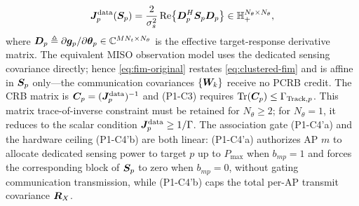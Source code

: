 \begin{equation}\label{eq:fim-original}
\bm{J}_p^{\text{data}}(\bm{S}_p) = \frac{2}{\sigma_s^2} \operatorname{Re}\!\left\{ \bm{D}_p^H \bm{S}_p \bm{D}_p \right\} \in \mathbb{H}_+^{N_\theta \times N_\theta},
\end{equation}
where $\bm{D}_p \triangleq \partial \bm{g}_p / \partial \boldsymbol{\theta}_p \in \mathbb{C}^{MN_t \times N_\theta}$ is the effective target-response derivative matrix. The equivalent MISO observation model uses the dedicated sensing covariance directly; hence \eqref{eq:fim-original} restates \eqref{eq:clustered-fim} and is affine in $\bm{S}_p$ only---the communication covariances $\{\bm{W}_k\}$ receive no PCRB credit. The CRB matrix is $\bm{C}_p=(\bm{J}_p^{\text{data}})^{-1}$ and (P1-C3) requires $\operatorname{Tr}(\bm{C}_p)\leq\Gamma_{\text{Track},p}$. This matrix trace-of-inverse constraint must be retained for $N_\theta\geq2$; for $N_\theta=1$, it reduces to the scalar condition $\bm{J}_p^{\text{data}}\geq1/\Gamma$. The association gate (P1-C4'a) and the hardware ceiling (P1-C4'b) are both linear: (P1-C4'a) authorizes AP $m$ to allocate dedicated sensing power to target $p$ up to $P_{\max}$ when $b_{mp}=1$ and forces the corresponding block of $\bm{S}_p$ to zero when $b_{mp}=0$, without gating communication transmission, while (P1-C4'b) caps the total per-AP transmit covariance $\bm{R}_X$.


